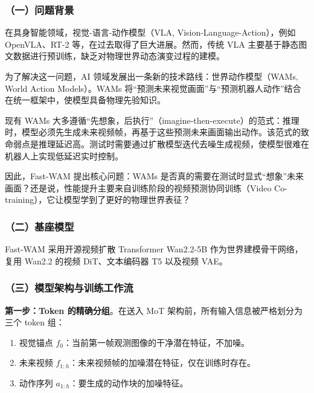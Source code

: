 \hypertarget{ux4e00ux95eeux9898ux80ccux666f-22}{%
\subsubsection{（一）问题背景}\label{ux4e00ux95eeux9898ux80ccux666f-22}}

在具身智能领域，视觉-语言-动作模型（VLA, Vision-Language-Action），例如 OpenVLA、RT-2 等，在过去取得了巨大进展。然而，传统 VLA 主要基于静态图文数据进行预训练，缺乏对物理世界动态演变过程的建模。

为了解决这一问题，AI 领域发展出一条新的技术路线：世界动作模型（WAMs, World Action Models）。WAMs 将``预测未来视觉画面''与``预测机器人动作''结合在统一框架中，使模型具备物理先验知识。

现有 WAMs 大多遵循``先想象，后执行''（imagine-then-execute）的范式：推理时，模型必须先生成未来视频帧，再基于这些预测未来画面输出动作。该范式的致命弱点是推理延迟高。测试时需要通过扩散模型迭代去噪生成视频，使模型很难在机器人上实现低延迟实时控制。

因此，Fast-WAM 提出核心问题：WAMs 是否真的需要在测试时显式``想象''未来画面？还是说，性能提升主要来自训练阶段的视频预测协同训练（Video Co-training），它让模型学到了更好的物理世界表征？

\hypertarget{ux4e8cux57faux5ea7ux6a21ux578b}{%
\subsubsection{（二）基座模型}\label{ux4e8cux57faux5ea7ux6a21ux578b}}

Fast-WAM 采用开源视频扩散 Transformer Wan2.2-5B 作为世界建模骨干网络，复用 Wan2.2 的视频 DiT、文本编码器 T5 以及视频 VAE。

\hypertarget{ux4e09ux6a21ux578bux67b6ux6784ux4e0eux8badux7ec3ux5de5ux4f5cux6d41}{%
\subsubsection{（三）模型架构与训练工作流}\label{ux4e09ux6a21ux578bux67b6ux6784ux4e0eux8badux7ec3ux5de5ux4f5cux6d41}}

\textbf{第一步：Token 的精确分组}。在送入 MoT 架构前，所有输入信息被严格划分为三个 token 组：

\begin{enumerate}
\def\labelenumi{\arabic{enumi}.}
\tightlist
\item
  视觉锚点 \(f_0\)：当前第一帧观测图像的干净潜在特征，不加噪。
\item
  未来视频 \(f_{1:h}\)：未来视频帧的加噪潜在特征，仅在训练时存在。
\item
  动作序列 \(a_{1:h}\)：要生成的动作块的加噪特征。
\end{enumerate}

